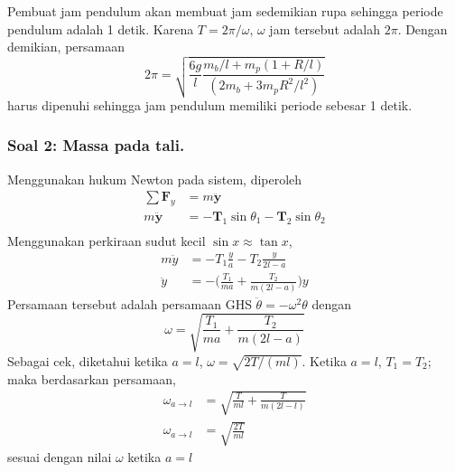 \documentclass[../../main.tex]{subfiles}
\begin{document}
  Pembuat jam pendulum akan membuat jam sedemikian rupa sehingga periode pendulum adalah 1 detik. Karena $T=2\pi/\omega$, $\omega$ jam tersebut adalah $2\pi$. Dengan demikian, persamaan
  \begin{equation*}
    2\pi=\sqrt{\frac{6g}{l}\frac{m_b/l+m_p(1+R/l)}{(2m_b+3m_pR^2/l^2)}}
  \end{equation*}
  harus dipenuhi sehingga jam pendulum memiliki periode sebesar 1 detik.
  
  \subsubsection{Soal 2: Massa pada tali.} Menggunakan hukum Newton pada sistem, diperoleh
  \begin{align*}
    \sum \mathbf{F}_y&=m\boldsymbol{\ddot{y}}\\
    m\boldsymbol{\ddot{y}}&=-\mathbf{T}_1\sin\theta_1-\mathbf{T}_2\sin\theta_2\\
  \end{align*}
  Menggunakan perkiraan sudut kecil $\sin x\approx\tan x$,
  \begin{align*}
    m\ddot{y}&=-{T}_1\frac{y}{a}-{T}_2\frac{y}{2l-a}\\
    \ddot{y}&=-\biggl(\frac{{T}_1}{ma}+\frac{{T}_2}{m(2l-a)}\biggr)y
  \end{align*}
  Persamaan tersebut adalah persamaan GHS $\ddot{\theta}=-\omega^2\theta$ dengan 
  \begin{equation*}
    \omega=\sqrt{\frac{{T}_1}{ma}+\frac{{T}_2}{m(2l-a)}}
  \end{equation*}
  Sebagai cek, diketahui ketika $a=l$, $\omega=\sqrt{2T/(ml)}$. Ketika $a=l$, $T_1=T_2$; maka berdasarkan persamaan,
  \begin{align*}
    \omega_{a\rightarrow l}&=\sqrt{\frac{{T}}{ml}+\frac{{T}}{m(2l-l)}}\\
    \omega_{a\rightarrow l}&=\sqrt{\frac{2T}{ml}}
  \end{align*}
  sesuai dengan nilai $\omega$ ketika $a=l$
\end{document}
